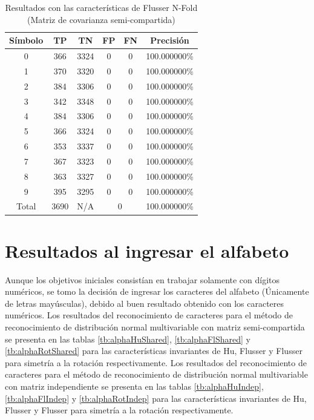 \documentclass[a4paper, 11pt, oneside]{report}
\begin{document}
\begin{table}
\centering
\begin{tabular}{|c|c|c|c|c|c|}
	\hline
	Símbolo & TP & TN & FP & FN & Precisión \\ 
	\hline
	0 & 366 & 3324 & 0 & 0 & 100.000000\% \\ 
	1 & 370 & 3320 & 0 & 0 & 100.000000\% \\ 
	2 & 384 & 3306 & 0 & 0 & 100.000000\% \\ 
	3 & 342 & 3348 & 0 & 0 & 100.000000\% \\ 
	4 & 384 & 3306 & 0 & 0 & 100.000000\% \\ 
	5 & 366 & 3324 & 0 & 0 & 100.000000\% \\ 
	6 & 353 & 3337 & 0 & 0 & 100.000000\% \\ 
	7 & 367 & 3323 & 0 & 0 & 100.000000\% \\ 
	8 & 363 & 3327 & 0 & 0 & 100.000000\% \\ 
	9 & 395 & 3295 & 0 & 0 & 100.000000\% \\ 
	\hline
	Total & 3690 & N/A & \multicolumn{2}{|c|}{0} & 100.000000\% \\
	\hline
\end{tabular}
\caption{Resultados con las características de Flusser N-Fold (Matriz de covarianza semi-compartida)}
\label{tb:numRotShared}
\end{table}

\section{Resultados al ingresar el alfabeto}
Aunque los objetivos iniciales consistían en trabajar solamente con dígitos numéricos, se tomo la decisión de ingresar los caracteres del alfabeto (Únicamente de letras mayúsculas), debido al buen resultado obtenido con los caracteres numéricos. Los resultados del reconocimiento de caracteres para el método de reconocimiento de distribución normal multivariable con matriz semi-compartida se presenta en las tablas \ref{tb:alphaHuShared}, \ref{tb:alphaFlShared} y \ref{tb:alphaRotShared} para las características invariantes de Hu, Flusser y Flusser para simetría a la rotación respectivamente. Los resultados del reconocimiento de caracteres para el método de reconocimiento de distribución normal multivariable con matriz independiente se presenta en las tablas \ref{tb:alphaHuIndep}, \ref{tb:alphaFlIndep} y \ref{tb:alphaRotIndep} para las características invariantes de Hu, Flusser y Flusser para simetría a la rotación respectivamente.
\end{document}
